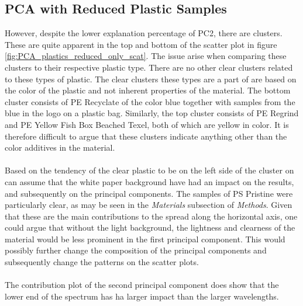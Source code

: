 \subsection{PCA with Reduced Plastic Samples}
However, despite the lower explanation percentage of PC2, there are clusters. These are quite apparent in the top and bottom of the scatter plot in figure \ref{fig:PCA_plastics_reduced_only_scat}. The issue arise when comparing these clusters to their respective plastic type. There are no other clear clusters related to these types of plastic. The clear clusters these types are a part of are based on the color of the plastic and not inherent properties of the material. The bottom cluster consists of PE Recyclate of the color blue together with samples from the blue in the logo on a plastic bag. Similarly, the top cluster consists of PE Regrind and PE Yellow Fish Box Beached Texel, both of which are yellow in color. It is therefore difficult to argue that these clusters indicate anything other than the color additives in the material.
\\\\
Based on the tendency of the clear plastic to be on the left side of the cluster on can assume that the white paper background have had an impact on the results, and subsequently on the principal components. The samples of PS Pristine were particularly clear, as may be seen in the \textit{Materials} subsection of \textit{Methods}. Given that these are the main contributions to the spread along the horizontal axis, one could argue that without the light background, the lightness and clearness of the material would be less prominent in the first principal component. This would possibly further change the composition of the principal components and subsequently change the patterns on the scatter plots. 
\\\\%
The contribution plot of the second principal component does show that the lower end of the spectrum has ha larger impact than the larger wavelengths. 

